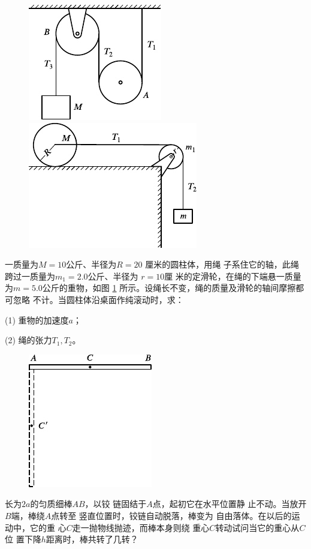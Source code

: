 \begin{exercises}
\begin{figure}[h]
  \begin{minipage}[b]{0.4\linewidth}
    \centering
    \includegraphics{figure/fig10.30}
    \caption{}
    \label{fig:10.30}
  \end{minipage}
  \begin{minipage}[b]{0.6\linewidth}
    \centering
    \includegraphics{figure/fig10.31}
    \caption{}
    \label{fig:10.31}
  \end{minipage}
\end{figure}

\exercise 一质量为$ M = 1 0 $公斤、半径为$ R = 2 0 $ 厘米的圆柱体，用绳
子系住它的轴，此绳跨过一质量为$ m _ { 1 } = 2 . 0 $公斤、半径为 $ r = 1 0 $厘
米的定滑轮，在绳的下端悬一质量为$ m = 5 . 0 $公斤的重物，如图
\ref{fig:10.31} 所示。设绳长不变，绳的质量及滑轮的轴间摩擦都可忽略
不计。当圆柱体沿桌面作纯滚动时，求：

\clearpage
(1) 重物的加速度$ a $；

(2) 绳的张力$ T _ { 1 } , T _ { 2 } $。

\begin{figure}
  \vspace{-1em}
  \centering
  \includegraphics{figure/fig10.32}
  \caption{}
  \label{fig:10.32}
\end{figure}
\exercise 长为$ 2a $的匀质细棒$ AB $，以铰
链固结于$ A $点，起初它在水平位置静
止不动。当放开$ B $端，棒绕$ A $点转至
竖直位置时，铰链自动脱落，棒变为
自由落体。在以后的运动中，它的重
心$ C $走一抛物线抛迹，而棒本身则绕
重心$ C $转动试问当它的重心从$ C $位
置下降$ h $距离时，棒共转了几转？


\end{exercises}
